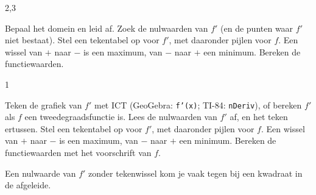 \begin{alleenvoor}{2,3}
\begin{werkwijze}
Bepaal het domein en leid af. Zoek de nulwaarden van $f'$ (en de punten waar $f'$ niet bestaat). Stel een tekentabel op voor $f'$, met daaronder pijlen voor $f$. Een wissel van $+$ naar $-$ is een maximum, van $-$ naar $+$ een minimum. Bereken de functiewaarden.
\end{werkwijze}
\end{alleenvoor}
\begin{alleenvoor}{1}
\begin{werkwijze}
Teken de grafiek van $f'$ met ICT (GeoGebra: \texttt{f'(x)}; TI-84: \texttt{nDeriv}), of bereken $f'$ als $f$ een tweedegraadsfunctie is. Lees de nulwaarden van $f'$ af, en het teken ertussen. Stel een tekentabel op voor $f'$, met daaronder pijlen voor $f$. Een wissel van $+$ naar $-$ is een maximum, van $-$ naar $+$ een minimum. Bereken de functiewaarden met het voorschrift van $f$.
\end{werkwijze}
\end{alleenvoor}

Een nulwaarde van $f'$ zonder tekenwissel kom je vaak tegen bij een kwadraat in de afgeleide.

